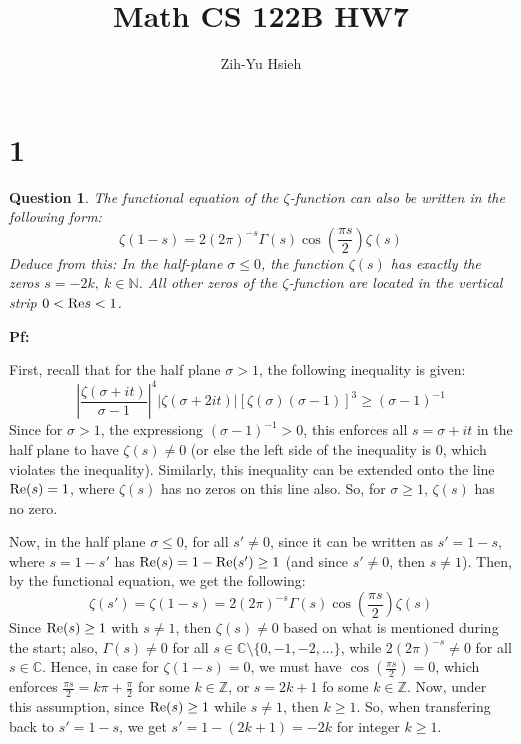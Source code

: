 \documentclass{article}
\title{Math CS 122B HW7}
\author{Zih-Yu Hsieh}
\newtheorem{question}{Question}
\begin{document}
\maketitle

\section*{1}
\begin{myBox}[]{}
    \begin{question}
        The functional equation of the $\zeta$-function can also be written in the following form:
        $$\zeta(1-s)=2(2\pi)^{-s}\Gamma(s)\cos\left(\frac{\pi s}{2}\right)\zeta(s)$$
        Deduce from this: In the half-plane $\sigma\leq 0$, the function $\zeta(s)$ has exactly the zeros $s=-2k,\ k\in\mathbb{N}$. All other zeros of the $\zeta$-function are located in the vertical strip $0<\textmd{Re} s<1$.
    \end{question}
\end{myBox}

\textbf{Pf:}

First, recall that for the half plane $\sigma>1$, the following inequality is given:
$$\left|\frac{\zeta(\sigma+it)}{\sigma-1}\right|^4|\zeta(\sigma+2it)|[\zeta(\sigma)(\sigma-1)]^3\geq (\sigma-1)^{-1}$$
Since for $\sigma>1$, the expressiong $(\sigma-1)^{-1}>0$, this enforces all $s = \sigma+it$ in the half plane to have $\zeta(s)\neq 0$ (or else the left side of the inequality is $0$, which violates the inequality). Similarly, this inequality can be extended onto the line $\textmd{Re}(s)=1$, where $\zeta(s)$ has no zeros on this line also. So, for $\sigma\geq 1$, $\zeta(s)$ has no zero.

\hfil

Now, in the half plane $\sigma\leq 0$, for all $s'\neq 0$, since it can be written as $s'=1-s$, where $s=1-s'$ has $\textmd{Re}(s)=1-\textmd{Re}(s') \geq 1$ (and since $s'\neq 0$, then $s\neq 1$). Then, by the functional equation, we get the following:
$$\zeta(s')=\zeta(1-s)=2(2\pi)^{-s}\Gamma(s)\cos\left(\frac{\pi s}{2}\right)\zeta(s)$$
Since $\textmd{Re}(s)\geq 1$ with $s\neq 1$, then $\zeta(s)\neq 0$ based on what is mentioned during the start; also, $\Gamma(s)\neq 0$ for all $s\in \mathbb{C}\setminus \{0,-1,-2,...\}$, while $2(2\pi)^{-s}\neq 0$ for all $s\in\mathbb{C}$. Hence, in case for $\zeta(1-s)=0$, we must have $\cos(\frac{\pi s}{2})=0$, which enforces $\frac{\pi s}{2} = k\pi + \frac{\pi}{2}$ for some $k\in\mathbb{Z}$, or $s = 2k+1$ fo some $k\in\mathbb{Z}$. Now, under this assumption, since $\textmd{Re}(s)\geq 1$ while $s\neq 1$, then $k\geq 1$. So, when transfering back to $s'=1-s$, we get $s' = 1-(2k+1)=-2k$ for integer $k\geq 1$.
\end{document}
